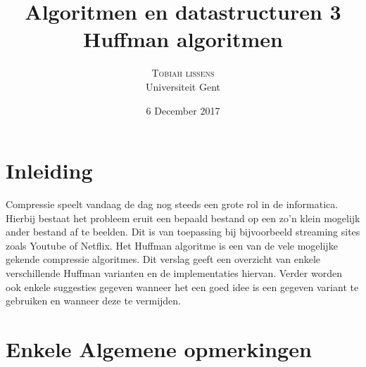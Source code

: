 \documentclass[twoside,twocolumn]{article}
\title{Algoritmen en datastructuren 3 \\ Huffman algoritmen } %
\author{%
\textsc{Tobiah lissens}\\[1ex]%
\normalsize Universiteit Gent \\ %
}
\date{6 December 2017} %
\begin{document}
\maketitle


\section{Inleiding}
Compressie speelt vandaag de dag nog steeds een grote rol in de informatica.
Hierbij bestaat het probleem eruit een bepaald bestand op een zo'n klein mogelijk ander bestand af te beelden.
Dit is van toepassing bij bijvoorbeeld streaming sites zoals Youtube of Netflix.
Het Huffman algoritme is een van de vele mogelijke gekende compressie algoritmes. 
Dit verslag geeft een overzicht van enkele verschillende Huffman varianten en de implementaties hiervan. Verder worden ook enkele suggesties gegeven wanneer het een goed idee is een gegeven variant te gebruiken en wanneer deze te vermijden.

\section{Enkele Algemene opmerkingen}
\end{document}
